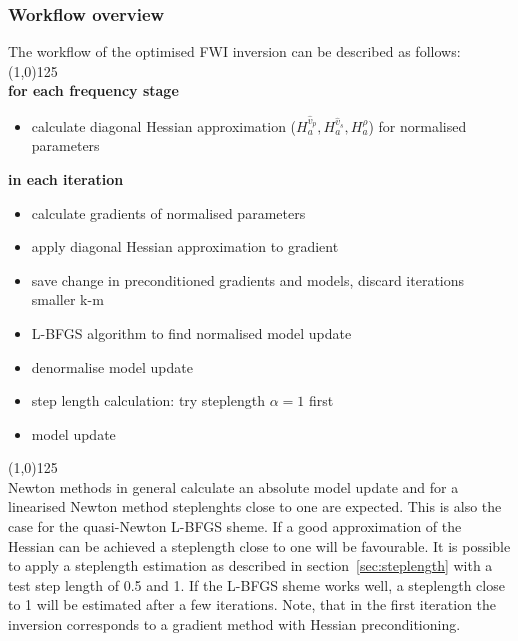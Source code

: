 \subsubsection*{Workflow overview}
The workflow of the optimised FWI inversion can be described as follows:\vspace{0.5cm}\\
\line(1,0){125}\\
\textbf{for each frequency stage}
\begin{itemize}
 \item calculate diagonal Hessian approximation ($H_a^{\hat v_p}, H_a^{\hat v_s}, H_a^{\hat\rho}$) for normalised parameters
\end{itemize}
\textbf{in each iteration}
\begin{itemize}
\item calculate gradients of normalised parameters
\item apply diagonal Hessian approximation to gradient 
\item save change in preconditioned gradients and models, discard iterations smaller k-m
\item L-BFGS algorithm to find normalised model update
\item denormalise model update
\item step length calculation: try steplength $\alpha=1$ first
\item model update
\end{itemize}
\line(1,0){125}\\
Newton methods in general calculate an absolute model update and for a linearised Newton method steplenghts close to one are expected. This is also the case for the quasi-Newton L-BFGS sheme. If a good approximation of the Hessian can be achieved  a steplength close to one will be favourable. It is possible to apply a steplength estimation as described in section~\ref{sec:steplength} with a test step length of 0.5 and 1. If the L-BFGS sheme works well, a steplength close to 1 will be estimated after a few iterations. Note, that in the first iteration the inversion corresponds to a gradient method with Hessian preconditioning.

